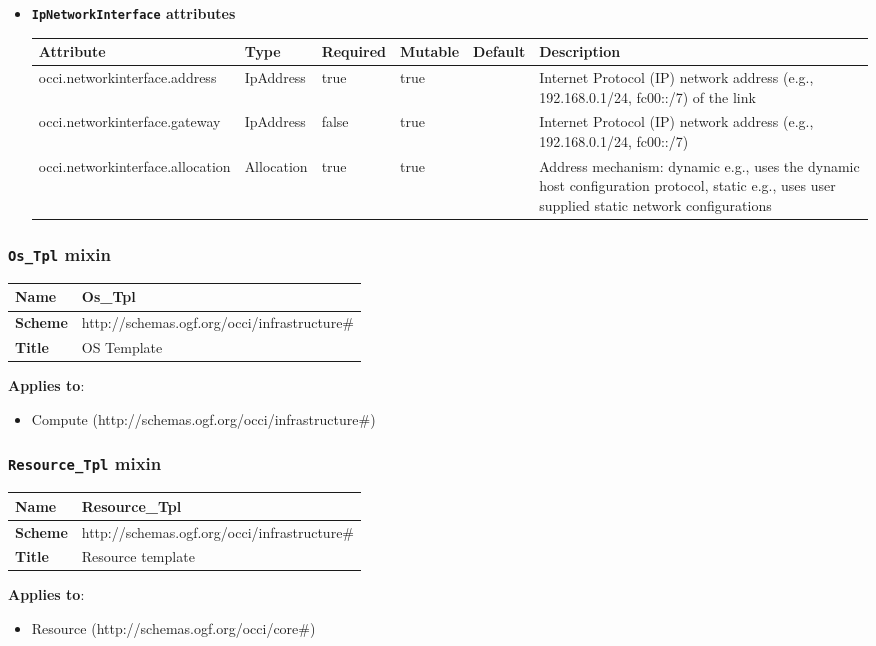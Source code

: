 \begin{itemize}
\item \textbf{\texttt{IpNetworkInterface} attributes}

\begin{tabularx}{\textwidth}{|l|l|p{1.4cm}|p{1.3cm}|l|X|}
  \hline
  \textbf{Attribute} & \textbf{Type} & \textbf{Required} & \textbf{Mutable} & \textbf{Default} & \textbf{Description} \\
  \hline  
  occi.networkinterface.address & IpAddress & true & true &  & Internet Protocol (IP) network address (e.g., 192.168.0.1/24, fc00::/7) of the link \\
  \hline
  occi.networkinterface.gateway & IpAddress & false & true &  & Internet Protocol (IP) network address (e.g., 192.168.0.1/24, fc00::/7) \\
  \hline
  occi.networkinterface.allocation & Allocation & true & true &  & Address mechanism: dynamic e.g., uses the dynamic host configuration protocol, static e.g., uses user supplied static network configurations \\
  \hline
\end{tabularx}
\end{itemize}


\subsubsection{\texttt{Os\_Tpl} mixin}
\begin{center}
\begin{tabular}{|l|l|}
  \hline
  \textbf{Name} & Os\_Tpl \\
  \hline  
  \textbf{Scheme} & http://schemas.ogf.org/occi/infrastructure\# \\
  \hline
  \textbf{Title} & OS Template \\
  \hline
\end{tabular}
\end{center}
\textbf{Applies to}:
\begin{itemize}
	\item Compute (http://schemas.ogf.org/occi/infrastructure\#)
\end{itemize}



\subsubsection{\texttt{Resource\_Tpl} mixin}
\begin{center}
\begin{tabular}{|l|l|}
  \hline
  \textbf{Name} & Resource\_Tpl \\
  \hline  
  \textbf{Scheme} & http://schemas.ogf.org/occi/infrastructure\# \\
  \hline
  \textbf{Title} & Resource template \\
  \hline
\end{tabular}
\end{center}
\textbf{Applies to}:
\begin{itemize}
	\item Resource (http://schemas.ogf.org/occi/core\#)
\end{itemize}



